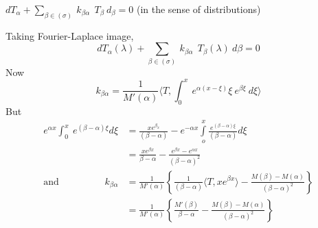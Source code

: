 $dT_\alpha + \sum\limits_{\beta \in (\sigma )} ~ k_{\beta \alpha} ~~
T_\beta ~ d_\beta = 0$ (in the sense of distributions)  

Taking Fourier-Laplace image,
$$
d T_\alpha (\lambda ) + \sum_{\beta \in (\sigma )} ~ k_{\beta \alpha}
~~ T_\beta (\lambda ) ~ d \beta = 0 
$$
Now 
$$
k_{\beta \alpha} = \dfrac{1}{M' (\alpha)}\langle T, \int_0^x ~
e^{\alpha (x - \xi)} \xi ~ e^{\beta \xi} ~ d \xi \rangle  
$$
But  
\begin{align*}
  e^{\alpha x} \int_0^x ~ e^{(\beta - \alpha) \xi} d \xi & =
  \frac{xe^{\beta_x}}{(\beta - \alpha)}-e^{-\alpha x} \int\limits_o^x
  \frac{e^{(\beta- \alpha)\xi}}{(\beta- \alpha)} d \xi\\ 
  & = \frac{xe^{\beta x}}{\beta -
    \alpha} - \frac{e^{\beta x} - e^{\alpha x}}{(\beta - \alpha)^2}\\  
\text{and} \hspace{2cm} 
  k_{\beta \alpha} &= \frac{1}{M' (\alpha )} \left \{ \frac{1}{(\beta
    - \alpha )}\langle T, xe^{\beta x} \rangle - \frac{M(\beta ) -
    M(\alpha )}{(\beta - \alpha )^2} \right\} \\ 
  &= \frac{1}{M' (\alpha )} \left\{ \frac{M'(\beta )}{\beta - \alpha}
  - \frac{M(\beta ) - M (\alpha )}{(\beta - \alpha )^2} \right\} 
\end{align*}

